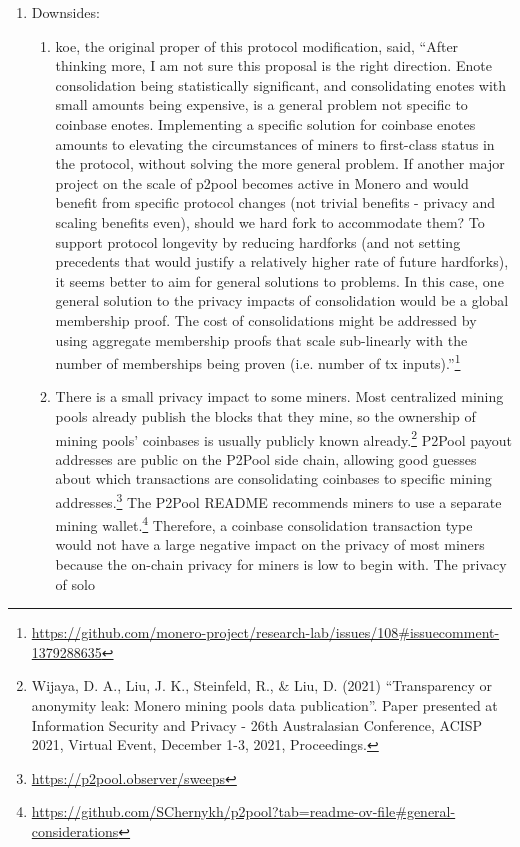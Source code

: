 \documentclass[english]{article}
\begin{document}
\begin{enumerate}
\begin{enumerate}
\item Downsides:
\begin{enumerate}
\item koe, the original proper of this protocol modification, said, ``After
thinking more, I am not sure this proposal is the right direction.
Enote consolidation being statistically significant, and consolidating
enotes with small amounts being expensive, is a general problem not
specific to coinbase enotes. Implementing a specific solution for
coinbase enotes amounts to elevating the circumstances of miners to
first-class status in the protocol, without solving the more general
problem. If another major project on the scale of p2pool becomes active
in Monero and would benefit from specific protocol changes (not trivial
benefits - privacy and scaling benefits even), should we hard fork
to accommodate them? To support protocol longevity by reducing hardforks
(and not setting precedents that would justify a relatively higher
rate of future hardforks), it seems better to aim for general solutions
to problems. In this case, one general solution to the privacy impacts
of consolidation would be a global membership proof. The cost of consolidations
might be addressed by using aggregate membership proofs that scale
sub-linearly with the number of memberships being proven (i.e. number
of tx inputs).''\footnote{\url{https://github.com/monero-project/research-lab/issues/108\#issuecomment-1379288635}}
\item There is a small privacy impact to some miners. Most centralized mining
pools already publish the blocks that they mine, so the ownership
of mining pools' coinbases is usually publicly known already.\footnote{Wijaya, D. A., Liu, J. K., Steinfeld, R., \& Liu, D. (2021) ``Transparency
or anonymity leak: Monero mining pools data publication''. Paper
presented at Information Security and Privacy - 26th Australasian
Conference, ACISP 2021, Virtual Event, December 1-3, 2021, Proceedings.} P2Pool payout addresses are public on the P2Pool side chain, allowing
good guesses about which transactions are consolidating coinbases
to specific mining addresses.\footnote{\url{https://p2pool.observer/sweeps}}
The P2Pool README recommends miners to use a separate mining wallet.\footnote{\url{https://github.com/SChernykh/p2pool?tab=readme-ov-file\#general-considerations}}
Therefore, a coinbase consolidation transaction type would not have
a large negative impact on the privacy of most miners because the
on-chain privacy for miners is low to begin with. The privacy of solo

\end{enumerate}
\end{enumerate}
\end{enumerate}
\end{document}
